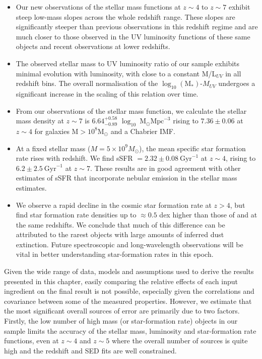 \begin{itemize}
  \item Our new observations of the stellar mass functions at $z \sim 4$ to $z \sim 7$ exhibit steep low-mass slopes across the whole redshift range. These slopes are significantly steeper than previous observations in this redshift regime and are much closer to those observed in the UV luminosity functions of these same objects and recent observations at lower redshifts.  
  \item The observed stellar mass to UV luminosity ratio of our sample exhibits minimal evolution with luminosity, with close to a constant M/L$_{UV}$ in all redshift bins. The overall normalisation of the $\log_{10} (\text{M}_{*})$-$M_{UV}$ undergoes a significant increase in the scaling of this relation over time.
  \item From our observations of the stellar mass function, we calculate the stellar mass density at $z \sim 7$ is $6.64^{+0.58}_{-0.89}$ $\log_{10}~\text{M}_{\odot} \text{Mpc}^{-3}$ rising to $7.36\pm0.06$ at $z \sim 4$ for galaxies M$> 10^8 \text{M}_{\odot}$ and a Chabrier IMF.
  \item At a fixed stellar mass ($M = 5 \times 10^9 M_{\odot}$), the mean specific star formation rate rises with redshift. We find sSFR $= 2.32\pm0.08~\text{Gyr}^{-1}$ at $z \sim 4$, rising to $6.2\pm2.5~\text{Gyr}^{-1}$ at $z \sim 7$. These results are in good agreement with other estimates of sSFR that incorporate nebular emission in the stellar mass estimates. 
  \item We observe a rapid decline in the cosmic star formation rate at $z > 4$, but find star formation rate densities up to $\approx 0.5$ dex higher than those of \citet{2012ApJ...754...83B} and \citet{Smit:2012is} at the same redshifts. We conclude that much of this difference can be attributed to the rarest objects with large amounts of inferred dust extinction. Future spectroscopic and long-wavelength observations will be vital in better understanding star-formation rates in this epoch. 
\end{itemize}

Given the wide range of data, models and assumptions used to derive the results presented in this chapter, easily comparing the relative effects of each input ingredient on the final result is not possible, especially given the correlations and covariance between some of the measured properties. However, we estimate that the most significant overall sources of error are primarily due to two factors. Firstly, the low number of high mass (or star-formation rate) objects in our sample limits the accuracy of the stellar mass, luminosity and star-formation rate functions, even at $z\sim4$ and $z\sim5$ where the overall number of sources is quite high and the redshift and SED fits are well constrained. 

